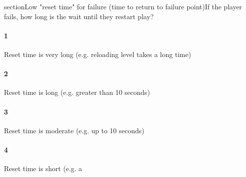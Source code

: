 section{Low "reset time" for failure (time to return to failure point)}If the player fails, how long is the wait until they restart play?\paragraph{1}Reset time is very long (e.g. reloading level takes a long time)\paragraph{2}Reset time is long (e.g. greater than 10 seconds)\paragraph{3}Reset time is moderate (e.g. up to 10 seconds)\paragraph{4}Reset time is short (e.g. a 